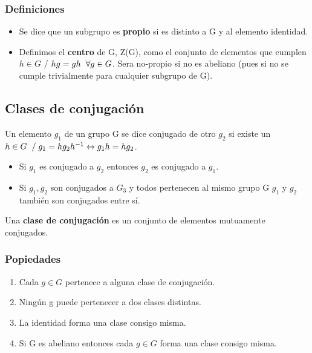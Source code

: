 \documentclass{article}
\begin{document}
\subsubsection{Definiciones}

\begin{itemize}
    \item Se dice que un subgrupo es \textbf{propio} si es distinto a G y al elemento identidad.
    \item Definimos el \textbf{centro} de G, Z(G), como el conjunto de elementos que cumplen $h\in G$ / $hg=gh \hspace{0.2cm} \forall g \in G$. Sera no-propio si no es abeliano (pues si no se cumple trivialmente para cualquier subgrupo de G).
\end{itemize}

\subsection{Clases de conjugación}

Un elemento $g_1$ de un grupo G se dice conjugado de otro $g_2$ si existe un $h\in G \hspace{0.2cm} / \hspace{0.1cm} g_1=hg_2h^{-1} \leftrightarrow g_1h=hg_2$.

\begin{itemize}
    \item Si $g_1$ es conjugado a $g_2$ entonces $g_2$ es conjugado a $g_1$.
    \item Si $g_1,g_2$ son conjugados a $G_3$ y todos pertenecen al mismo grupo G $g_1$ y $g_2$ también son conjugados entre sí.
\end{itemize} 

Una \textbf{clase de conjugación} es un conjunto de elementos mutuamente conjugados.

\subsubsection{Popiedades}

\begin{enumerate}
    \item Cada $g\in G$ pertenece a alguna clase de conjugación.
    \item Ningún g puede pertenecer a dos clases distintas.
    \item La identidad forma una clase consigo misma.
    \item Si G es abeliano entonces cada $g\in G$ forma una clase consigo misma.
\end{enumerate}
\end{document}
